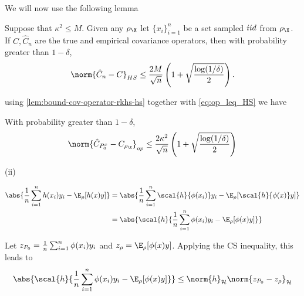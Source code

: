 We will now use the following lemma
\begin{lemma}
  \label{lem:bound-cov-operator-rkhs-hs}
  Suppose that \(\kappa^{2} \leq M\). Given any \(\rho_{\X}\) let \(\{x_{i}\}_{i=1}^{n}\) be a set sampled \(iid\) from \(\rho_{\X}\). If \(C,
  \hat{C}_{n}\) are the true and empirical covariance operators, then with
  probability greater than \(1 - \delta\),
  \begin{equation}
    \label{eq:bound-cov-operator-rkhs-hs}
    \norm{\hat{C}_{n} - C}_{HS} \leq \frac{2M}{\sqrt{n}}\left( 1 + \sqrt{\frac{\log(1/\delta)}{2}} \right).
  \end{equation}
\end{lemma}
using \ref{lem:bound-cov-operator-rkhs-hs} together with \ref{eq:op_leq_HS} we have
\begin{corollary}
  \label{cor:bound-cov-op-diff-in-prob}
  With probability greater than \(1 - \delta\),
  \begin{equation}
    \label{eq:bound-cov-op-diff-in-prob}
    \norm{\hat{C}_{\poolsetx_{0}} - C_{\rho_{\X}}}_{op} \leq \frac{2\kappa^{2}}{\sqrt{n}}\left( 1 + \sqrt{\frac{\log(1/\delta)}{2}} \right)
  \end{equation}
\end{corollary}

\begin{description}
\item[{(ii)}] 
\end{description}
\begin{align*}
  \abs{\frac{1}{n} \sum_{i=1}^n h(x_i)y_i - \E_{\rho}[h(x)y]} & = \abs{\frac{1}{n} \sum_{i=1}^n \scal{ h}{ \phi(x_i) } y_i - \E_{\rho}[\scal{ h}{ \phi(x) } y]} \\
                                                              & = \abs{\scal{ h}{ \frac{1}{n} \sum_{i=1}^n \phi(x_i) y_i - \E_{\rho}[\phi(x) y] }}
\end{align*}

Let \(z_{P_{0}} = \frac{1}{n} \sum_{i=1}^n \phi(x_i) y_i\) and
\(z_{\rho} = \E_{\rho}[\phi(x) y]\). Applying the CS inequality, this leads to
\begin{equation*}
  \abs{\scal{h}{\frac{1}{n} \sum_{i=1}^n \phi(x_i) y_i - \E_{\rho}[\phi(x) y] }} \leq \norm{h}_{\rkhs{H}}\norm{z_{\poolset_0} - z_{\rho}}_{\rkhs{H}}
\end{equation*}

